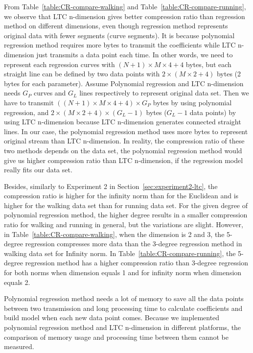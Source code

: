 From Table~\ref{table:CR-compare-walking} and
Table~\ref{table:CR-compare-running}, we observe that LTC n-dimension gives
better compression ratio than regression method on different dimensions, even
though regression method represents original data with fewer segments (curve
segments). It is because polynomial regression method requires more bytes to
transmit the coefficients while LTC n-dimension just transmits a data point each
time. In other words, we need to represent each regression curves with
$(N+1)\times M\times 4+4$ bytes, but each straight line can be defined by two
data points with $2\times(M\times 2+4)$ bytes (2 bytes for each parameter).
Assume Polynomial regression and LTC n-dimension needs $G_P$ curves and $G_L$
lines respectively to represent original data set. Then we have to transmit
$((N+1)\times M\times 4+4)\times G_P$ bytes by using polynomial regression, and
$2\times(M\times 2+4) \times (G_L-1)$ bytes ($G_L-1$ data points) by using LTC
n-dimension because LTC n-dimension generates connected straight lines. In our
case, the polynomial regression method uses more bytes to represent original
stream than LTC n-dimension. In reality, the compression ratio of these two
methods depends on the data set, the polynomial regression method would give us
higher compression ratio than LTC n-dimension, if the regression model really
fits our data set.
 
Besides, similarly to Experiment 2 in Section~\ref{sec:experiment2-ltc}, the
compression ratio is higher for the infinity norm than for the Euclidean and is
higher for the walking data set than for running data set. For the given degree
of polynomial regression method, the higher degree results in a smaller
compression ratio for walking and running in general, but the variations are
slight. However, in Table~\ref{table:CR-compare-walking}, when the dimension is
2 and 3, the 5-degree regression compresses more data than the 3-degree
regression method in walking data set for Infinity norm. In
Table~\ref{table:CR-compare-running}, the 5-degree regression method has a
higher compression ratio than 3-degree regression for both norms when dimension
equals 1 and for infinity norm when dimension equals 2.

Polynomial regression method needs a lot of memory to save all the data points
between two transmission and long processing time to calculate coefficients and
build model when each new data point comes. Because we implemented polynomial
regression method and LTC n-dimension in different platforms, the comparison of
memory usage and processing time between them cannot be measured.

